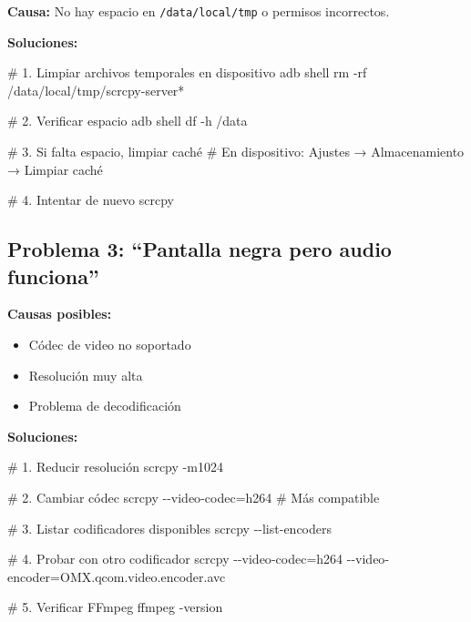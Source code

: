 \documentclass[
  doc,
  floatsintext,
  longtable,
  a4paper,
  nolmodern,
  notxfonts,
  notimes,
  12pt,
  colorlinks=true,linkcolor=blue,citecolor=blue,urlcolor=blue]{apa7}
\newenvironment{Shaded}{\begin{snugshade}}{\end{snugshade}}
\newcommand{\AttributeTok}[1]{\textcolor[rgb]{0.40,0.45,0.13}{#1}}
\newcommand{\CommentTok}[1]{\textcolor[rgb]{0.37,0.37,0.37}{#1}}
\newcommand{\ExtensionTok}[1]{\textcolor[rgb]{0.00,0.23,0.31}{#1}}
\newcommand{\NormalTok}[1]{\textcolor[rgb]{0.00,0.23,0.31}{#1}}
\newcommand{\OperatorTok}[1]{\textcolor[rgb]{0.37,0.37,0.37}{#1}}
\newcommand{\PreprocessorTok}[1]{\textcolor[rgb]{0.68,0.00,0.00}{#1}}
\providecommand{\tightlist}{%
  \setlength{\itemsep}{0pt}\setlength{\parskip}{0pt}}
\begin{document}
\textbf{Causa:} No hay espacio en \texttt{/data/local/tmp} o permisos
incorrectos.

\textbf{Soluciones:}

\begin{Shaded}
\begin{Highlighting}[]
\CommentTok{\# 1. Limpiar archivos temporales en dispositivo}
\ExtensionTok{adb}\NormalTok{ shell rm }\AttributeTok{{-}rf}\NormalTok{ /data/local/tmp/scrcpy{-}server}\PreprocessorTok{*}

\CommentTok{\# 2. Verificar espacio}
\ExtensionTok{adb}\NormalTok{ shell df }\AttributeTok{{-}h}\NormalTok{ /data}

\CommentTok{\# 3. Si falta espacio, limpiar caché}
\CommentTok{\# En dispositivo: Ajustes → Almacenamiento → Limpiar caché}

\CommentTok{\# 4. Intentar de nuevo}
\ExtensionTok{scrcpy}
\end{Highlighting}
\end{Shaded}

\subsection{Problema 3: ``Pantalla negra pero audio
funciona''}\label{problema-3-pantalla-negra-pero-audio-funciona}

\textbf{Causas posibles:}

\begin{itemize}
\tightlist
\item
  Códec de video no soportado
\item
  Resolución muy alta
\item
  Problema de decodificación
\end{itemize}

\textbf{Soluciones:}

\begin{Shaded}
\begin{Highlighting}[]
\CommentTok{\# 1. Reducir resolución}
\ExtensionTok{scrcpy} \AttributeTok{{-}m1024}

\CommentTok{\# 2. Cambiar códec}
\ExtensionTok{scrcpy} \AttributeTok{{-}{-}video{-}codec}\OperatorTok{=}\NormalTok{h264  }\CommentTok{\# Más compatible}

\CommentTok{\# 3. Listar codificadores disponibles}
\ExtensionTok{scrcpy} \AttributeTok{{-}{-}list{-}encoders}

\CommentTok{\# 4. Probar con otro codificador}
\ExtensionTok{scrcpy} \AttributeTok{{-}{-}video{-}codec}\OperatorTok{=}\NormalTok{h264 }\AttributeTok{{-}{-}video{-}encoder}\OperatorTok{=}\NormalTok{OMX.qcom.video.encoder.avc}

\CommentTok{\# 5. Verificar FFmpeg}
\ExtensionTok{ffmpeg} \AttributeTok{{-}version}
\end{Highlighting}
\end{Shaded}
\end{document}
